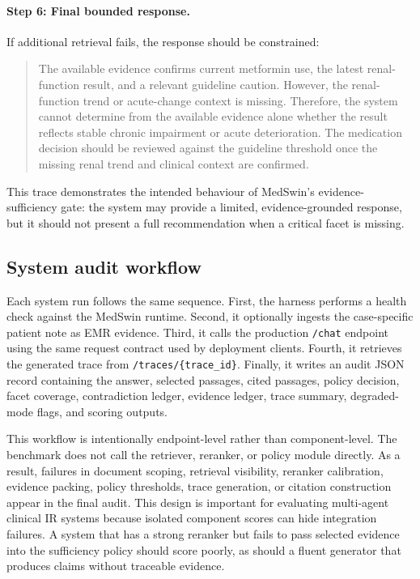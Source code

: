 \documentclass[conference]{IEEEtran}
\begin{document}
\paragraph{Step 6: Final bounded response.}
If additional retrieval fails, the response should be constrained:

\begin{quote}
The available evidence confirms current metformin use, the latest renal-function result, and a relevant guideline caution. However, the renal-function trend or acute-change context is missing. Therefore, the system cannot determine from the available evidence alone whether the result reflects stable chronic impairment or acute deterioration. The medication decision should be reviewed against the guideline threshold once the missing renal trend and clinical context are confirmed.
\end{quote}

This trace demonstrates the intended behaviour of MedSwin's evidence-sufficiency gate: the system may provide a limited, evidence-grounded response, but it should not present a full recommendation when a critical facet is missing.


\subsection{System audit workflow}
Each system run follows the same sequence. First, the harness performs a health check against the MedSwin runtime. Second, it optionally ingests the case-specific patient note as EMR evidence. Third, it calls the production \texttt{/chat} endpoint using the same request contract used by deployment clients. Fourth, it retrieves the generated trace from \texttt{/traces/\{trace\_id\}}. Finally, it writes an audit JSON record containing the answer, selected passages, cited passages, policy decision, facet coverage, contradiction ledger, evidence ledger, trace summary, degraded-mode flags, and scoring outputs.

This workflow is intentionally endpoint-level rather than component-level. The benchmark does not call the retriever, reranker, or policy module directly. As a result, failures in document scoping, retrieval visibility, reranker calibration, evidence packing, policy thresholds, trace generation, or citation construction appear in the final audit. This design is important for evaluating multi-agent clinical IR systems because isolated component scores can hide integration failures. A system that has a strong reranker but fails to pass selected evidence into the sufficiency policy should score poorly, as should a fluent generator that produces claims without traceable evidence.
\end{document}

